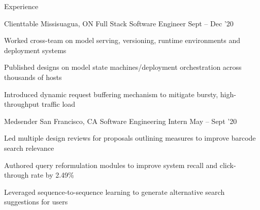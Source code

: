 \documentclass{resume} %
\begin{document}
\begin{rSection}{Experience}

  \begin{rWorkSection}{Clienttable}
                      {Missisuagua, ON}
                      {Full Stack Software Engineer }
                      {Sept -- Dec '20}
  {
    \item Worked cross-team on model serving, versioning, runtime environments and
      deployment systems
    \item Published designs on model state
      machines/deployment orchestration across thousands of hosts
    \item Introduced dynamic request buffering mechanism to mitigate bursty,
      high-throughput traffic load
  }
  \end{rWorkSection}

  \begin{rWorkSection}{Medsender}
                     {San Francisco, CA}
                     {Software Engineering Intern}
                     {May -- Sept '20}
  {
    \item Led multiple design reviews for proposals outlining measures to
      improve barcode search relevance
    \item Authored query reformulation modules to improve system recall and
      click-through rate by 2.49\%
    \item Leveraged sequence-to-sequence learning to generate alternative
      search suggestions for users
  }
  \end{rWorkSection}

\end{rSection}


\end{document}
